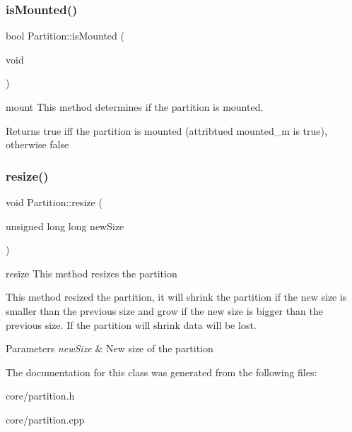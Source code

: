 \subsubsection{\texorpdfstring{is\+Mounted()}{isMounted()}}
{\footnotesize\ttfamily bool Partition\+::is\+Mounted (\begin{DoxyParamCaption}\item[{void}]{ }\end{DoxyParamCaption})}



mount This method determines if the partition is mounted. 

\begin{DoxyReturn}{Returns}
true iff the partition is mounted (attribtued mounted\+\_\+m is true), otherwise false 
\end{DoxyReturn}
\mbox{\label{classcore_1_1logic_1_1_partition_ab7b1a0f3847b9117a284cf4022e05e88}} 
\subsubsection{\texorpdfstring{resize()}{resize()}}
{\footnotesize\ttfamily void Partition\+::resize (\begin{DoxyParamCaption}\item[{unsigned long long}]{new\+Size }\end{DoxyParamCaption})}



resize This method resizes the partition 

This method resized the partition, it will shrink the partition if the new size is smaller than the previous size and grow if the new size is bigger than the previous size. If the partition will shrink data will be lost. 
\begin{DoxyParams}{Parameters}
{\em new\+Size} & New size of the partition \\
\hline
\end{DoxyParams}


The documentation for this class was generated from the following files\+:\begin{DoxyCompactItemize}
\item 
core/partition.\+h\item 
core/partition.\+cpp\end{DoxyCompactItemize}
